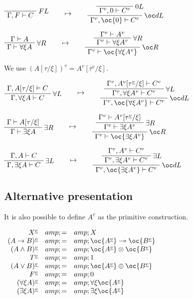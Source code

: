 \(\LabelRule{F L}
\NulRule{\Gamma,F\vdash C}
\DisplayProof
\qquad\mapsto\qquad
\LabelRule{\zero L}
\NulRule{\Gamma^v,\zero\vdash C^v}
\LabelRule{\oc d L}
\UnaRule{\Gamma^v,\oc{\zero}\vdash C^v}
\DisplayProof\)

\(\AxRule{\Gamma\vdash A}
\LabelRule{\forall R}
\UnaRule{\Gamma\vdash \forall\xi A}
\DisplayProof
\qquad\mapsto\qquad
\AxRule{\Gamma^v\vdash A^v}
\LabelRule{\forall R}
\UnaRule{\Gamma^v\vdash \forall\xi A^v}
\LabelRule{\oc R}
\UnaRule{\Gamma^v\vdash \oc{\forall\xi A^v}}
\DisplayProof\)

We use \((A[\tau/\xi])^v=A^v[\tau^{\underline{v}}/\xi]\).

\(\AxRule{\Gamma,A[\tau/\xi]\vdash C}
\LabelRule{\forall L}
\UnaRule{\Gamma,\forall\xi A\vdash C}
\DisplayProof
\qquad\mapsto\qquad
\AxRule{\Gamma^v,A^v[\tau^{\underline{v}}/\xi]\vdash C^v}
\LabelRule{\forall L}
\UnaRule{\Gamma^v,\forall\xi A^v\vdash C^v}
\LabelRule{\oc d L}
\UnaRule{\Gamma^v,\oc{\forall\xi A^v}\vdash C^v}
\DisplayProof\)

\(\AxRule{\Gamma\vdash A[\tau/\xi]}
\LabelRule{\exists R}
\UnaRule{\Gamma\vdash \exists\xi A}
\DisplayProof
\qquad\mapsto\qquad
\AxRule{\Gamma^v\vdash A^v[\tau^{\underline{v}}/\xi]}
\LabelRule{\exists R}
\UnaRule{\Gamma^v\vdash \exists\xi A^v}
\LabelRule{\oc R}
\UnaRule{\Gamma^v\vdash \oc{\exists\xi A^v}}
\DisplayProof\)

\(\AxRule{\Gamma,A\vdash C}
\LabelRule{\exists L}
\UnaRule{\Gamma,\exists\xi A\vdash C}
\DisplayProof
\qquad\mapsto\qquad
\AxRule{\Gamma^v,A^v\vdash C^v}
\LabelRule{\exists L}
\UnaRule{\Gamma^v,\exists\xi A^v\vdash C^v}
\LabelRule{\oc d L}
\UnaRule{\Gamma^v,\oc{\exists\xi A^v}\vdash C^v}
\DisplayProof\)

\subsection{Alternative
presentation}\label{alternative-presentation-2}

It is also possible to define \(A^{\underline{v}}\) as the primitive
construction.

\(\begin{array}{rcl}
X^{\underline{v}} &amp; = &amp; X \\
(A\imp B)^{\underline{v}} &amp; = &amp; \oc{A^{\underline{v}}}\limp\oc{B^{\underline{v}}} \\
(A\wedge B)^{\underline{v}} &amp; = &amp; \oc{A^{\underline{v}}}\tens\oc{B^{\underline{v}}} \\
T^{\underline{v}} &amp; = &amp; \one \\
(A\vee B)^{\underline{v}} &amp; = &amp; \oc{A^{\underline{v}}}\plus\oc{B^{\underline{v}}} \\
F^{\underline{v}} &amp; = &amp; \zero \\
(\forall\xi A)^{\underline{v}} &amp; = &amp; \forall\xi \oc{A^{\underline{v}}} \\
(\exists\xi A)^{\underline{v}} &amp; = &amp; \exists\xi \oc{A^{\underline{v}}}
\end{array}\)

